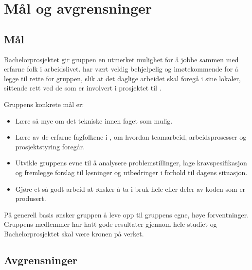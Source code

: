 \chapter{Mål og avgrensninger}
\section{Mål}
Bachelorprosjektet gir gruppen en utmerket mulighet for å jobbe sammen med erfarne folk i arbeidslivet. \mw{} har vært veldig behjelpelig og imøtekommende for å legge til rette for gruppen, slik at det daglige arbeidet skal foregå i \mw{} sine lokaler, sittende rett ved de som er involvert i prosjektet til \rb{}.

Gruppens konkrete mål er:
\begin{itemize}
\item Lære så mye om det tekniske innen faget som mulig.
\item Lære av de erfarne fagfolkene i \mw{}, om hvordan teamarbeid, arbeidsprosesser og prosjektstyring foregår.
\item Utvikle gruppens evne til å analysere problemstillinger, lage kravspesifikasjon og fremlegge forslag til løsninger og utbedringer i forhold til dagens situasjon.
\item Gjøre et så godt arbeid at \mw{} ønsker å ta i bruk hele eller deler av koden som er produsert.
\end{itemize}

På generell basis ønsker gruppen å leve opp til gruppens egne, høye forventninger. Gruppens medlemmer har hatt gode resultater gjennom hele studiet og Bachelorprosjektet skal være kronen på verket.

\section{Avgrensninger}
